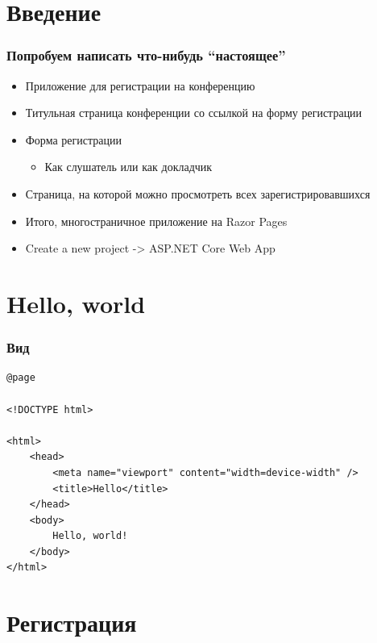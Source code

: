 \documentclass{../../slides-style}
\begin{document}
    \begin{frame}[plain]
        \titlepage
    \end{frame}

    \section{Введение}

    \begin{frame}
        \frametitle{Попробуем написать что-нибудь ``настоящее''}
        \begin{itemize}
            \item Приложение для регистрации на конференцию
            \item Титульная страница конференции со ссылкой на форму регистрации
            \item Форма регистрации
            \begin{itemize}
                \item Как слушатель или как докладчик
            \end{itemize}
            \item Страница, на которой можно просмотреть всех зарегистрировавшихся
            \item Итого, многостраничное приложение на Razor Pages
            \item Create a new project -> ASP.NET Core Web App
        \end{itemize}
    \end{frame}

    \section{Hello, world}

    \begin{frame}[fragile]
        \frametitle{Вид}
        \begin{verbatim}
@page

<!DOCTYPE html>

<html>
    <head>
        <meta name="viewport" content="width=device-width" />
        <title>Hello</title>
    </head>
    <body>
        Hello, world!
    </body>
</html>
        \end{verbatim}
    \end{frame}

    \section{Регистрация}
\end{document}

